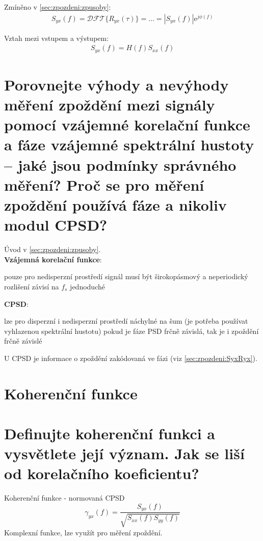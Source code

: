 \documentclass[a4paper,12pt]{article}   %
\newcommand{\mt}[1]{$#1$}
\newcommand{\e}{\text{e}}
\newcommand{\okruh}[1]{\section*{\Large #1}}
\begin{document}
Zmíněno v \ref{sec:zpozdeni:zpusoby}:
\begin{align*}
        S_{yx}(f) = \mathscr{DFT}\{R_{yx}(\tau)\} = \dots = |S_{yx}(f)|\e^{j\phi(f)}
\end{align*}

Vztah mezi vstupem a výstupem:
\begin{align*}
        S_{yx}(f) = H(f) S_{xx}(f) 
\end{align*}



\section{Porovnejte výhody a nevýhody měření zpoždění mezi signály pomocí vzájemné korelační funkce a fáze vzájemné spektrální hustoty – jaké jsou podmínky správného měření? Proč se pro měření zpoždění používá fáze a nikoliv modul CPSD?}
Úvod v \ref{sec:zpozdeni:zpusoby}.\\
\textbf{Vzájemná korelační funkce}:
\begin{outline}
        \1 pouze pro nedisperzní prostředí 
        \1 signál musí být širokopásmový a neperiodický
        \1 rozlišení závisí na \mt{f_s}
        \1 jednoduché
\end{outline}

\textbf{CPSD}:
\begin{outline}
        \1 lze pro disperzní i nedisperzní prostředí
        \1 náchylné na šum (je potřeba používat vyhlazenou spektrální hustotu)
        \1 pokud je fáze PSD frčně závislá, tak je i zpoždění frčně závislé
\end{outline}

U CPSD je informace o zpoždění zakódovaná ve fázi (viz \ref{sec:zpozdeni:SyxRyx}).





\clearpage 

\okruh{Koherenční funkce}
\section{Definujte koherenční funkci a vysvětlete její význam. Jak se liší od korelačního koeficientu?}
Koherenční funkce - normovaná CPSD
\begin{equation}
        \gamma_{yx}(f) = \frac{S_{yx}(f)}{\sqrt{S_{xx}(f)S_{yy}(f)}}
\end{equation}
Komplexní funkce, lze využít pro měření zpoždění.
\end{document}
